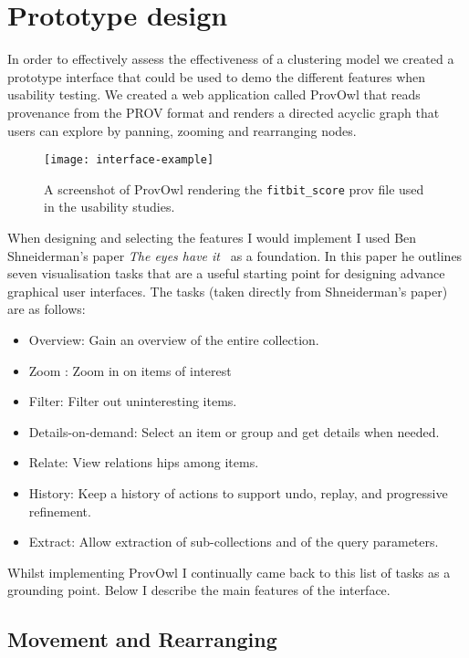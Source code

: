 \chapter{Prototype design}

In order to effectively assess the effectiveness of a clustering model we created a prototype interface that could be used to demo the different features when usability testing. We created a web application called ProvOwl that reads provenance from the PROV format and renders a directed acyclic graph that users can explore by panning, zooming and rearranging nodes.

\begin{figure}[h]
\centering
\texttt{[image: interface-example]}
\caption{A screenshot of ProvOwl rendering the \texttt{fitbit\_score} prov file used in the usability studies.}
\label{fig:interface-example}
\end{figure}

When designing and selecting the features I would implement I used Ben Shneiderman's paper \textit{The eyes have it}~\cite{Shneiderman1996} as a foundation. In this paper he outlines seven visualisation tasks that are a useful starting point for designing advance graphical user interfaces. The tasks (taken directly from Shneiderman's paper) are as follows:

\begin{itemize}
\item Overview: Gain an overview of the entire collection. 
\item Zoom : Zoom in on items of interest 
\item Filter: Filter out uninteresting items. 
\item Details-on-demand: Select an item or group and get details when needed.
\item Relate: View relations hips among items. 
\item History: Keep a history of actions to support undo, replay, and progressive refinement.
\item Extract: Allow extraction of sub-collections and of the query parameters. 
\end{itemize}

Whilst implementing ProvOwl I continually came back to this list of tasks as a grounding point. Below I describe the main features of the interface. 

\section{Movement and Rearranging}
\label{sec:movement_and_rearranging}

